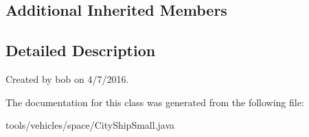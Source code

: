 \subsection*{Additional Inherited Members}


\subsection{Detailed Description}
Created by bob on 4/7/2016. 

The documentation for this class was generated from the following file\+:\begin{DoxyCompactItemize}
\item 
tools/vehicles/space/City\+Ship\+Small.\+java\end{DoxyCompactItemize}
